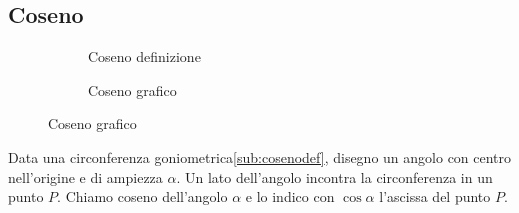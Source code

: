 \subsection{Coseno}
\label{sec:cosenogonio}
\begin{figure}
	\begin{subfigure}[b]{.5\linewidth}
		\centering
		
		\caption{Coseno definizione}\label{sub:cosenodef}
	\end{subfigure}%
	\begin{subfigure}[b]{.5\linewidth}
	\centering
		
		\caption{Coseno grafico}\label{sub:cosenograf}
	\end{subfigure}
	\label{tab:funzcos}
\end{figure}
\begin{definizione}[Coseno]
Data una circonferenza goniometrica\nobs\vref{sub:cosenodef}, disegno un angolo con centro nell'origine e di ampiezza $\alpha$. Un lato dell'angolo incontra la circonferenza in un punto $P$.  Chiamo coseno dell'angolo $\alpha$ e lo indico con $\cos\alpha$ l'ascissa del punto $P$.
\end{definizione}

